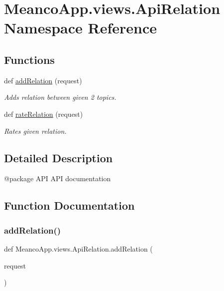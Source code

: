 \hypertarget{namespace_meanco_app_1_1views_1_1_api_relation}{}\section{Meanco\+App.\+views.\+Api\+Relation Namespace Reference}
\label{namespace_meanco_app_1_1views_1_1_api_relation}
\subsection*{Functions}
\begin{DoxyCompactItemize}
\item 
def \hyperlink{namespace_meanco_app_1_1views_1_1_api_relation_a1b22bc3ee791b4fe913ea1f786b2af58}{add\+Relation} (request)
\begin{DoxyCompactList}\small\item\em Adds relation between given 2 topics. \end{DoxyCompactList}\item 
def \hyperlink{namespace_meanco_app_1_1views_1_1_api_relation_a024057c446726ba7e55cba45c6ce116c}{rate\+Relation} (request)
\begin{DoxyCompactList}\small\item\em Rates given relation. \end{DoxyCompactList}\end{DoxyCompactItemize}


\subsection{Detailed Description}
\begin{DoxyVerb}@package API
API documentation\end{DoxyVerb}
 

\subsection{Function Documentation}
\hypertarget{namespace_meanco_app_1_1views_1_1_api_relation_a1b22bc3ee791b4fe913ea1f786b2af58}{}\label{namespace_meanco_app_1_1views_1_1_api_relation_a1b22bc3ee791b4fe913ea1f786b2af58} 
\subsubsection{\texorpdfstring{add\+Relation()}{addRelation()}}
{\footnotesize\ttfamily def Meanco\+App.\+views.\+Api\+Relation.\+add\+Relation (\begin{DoxyParamCaption}\item[{}]{request }\end{DoxyParamCaption})}



